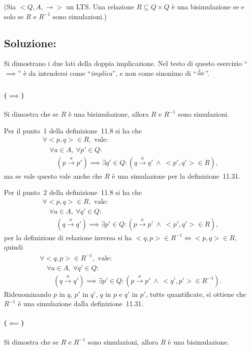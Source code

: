 \documentclass[a4paper,twosides]{report}
\begin{document}
{\tiny
(Sia $<Q, A, \rightarrow >$ un LTS. Una relazione $R \subseteq Q \times Q$ è una bisimulazione se e solo se $R$ e $R^{-1}$
sono simulazioni.)
}
\subsection*{Soluzione:}
Si dimostrano i due lati della doppia implicazione. Nel testo di
questo esercizio ``$\implies$'' \`e da intendersi come ``\emph{implica}'', e
non come sinonimo di ``$\xRightarrow{\varepsilon}$''.
\paragraph{($\implies$)} Si dimostra che se $R$ \`e una
bisimulazione, allora $R$ e $R^{-1}$ sono simulazioni.

Per il punto~1 della
definizione~11.8 si ha che 
\begin{align*}
&\forall <p,q>\in R,\text{ vale:}\\
&\quad\forall a\in A,\ \forall p'\in Q:\\
&\quad\quad(p\xrightarrow{a} p')\implies\exists q'\in Q:(q\xrightarrow{a} q'\
\land\ <p',q'>\in R),
\end{align*}
ma se vale questo vale anche che $R$ \`e
una simulazione per la definizione~11.31.

Per il punto~2 della definizione~11.8 si ha che
\begin{align*}
&\forall <p,q>\in R,\text{ vale:}\\
&\quad\forall a\in A,\ \forall q'\in Q:\\
&\quad\quad(q\xrightarrow{a} q')\implies\exists p'\in Q:(p\xrightarrow{a} p'\
\land\ <p',q'>\in R),
\end{align*}
per la definizione di relazione inversa si ha
$<q,p>\in R^{-1}\iff<p,q>\in R$, quindi
\begin{align*}
&\forall <q,p>\in R^{-1},\text{ vale:}\\
&\quad\forall a\in A,\ \forall q'\in Q:\\
&\quad\quad(q\xrightarrow{a} q')\implies\exists p'\in Q:(p\xrightarrow{a} p'\
\land\ <q',p'>\in R^{-1}).
\end{align*}
Ridenominando $p$ in $q$, $p'$ in $q'$, $q$ in $p$ e $q'$ in $p'$,
tutte quantificate, si ottiene che $R^{-1}$ \`e una simulazione 
dalla definizione~11.31.

\paragraph{($\impliedby$)} Si dimostra che se $R$ e $R^{-1}$ sono
simulazioni, allora $R$ \`e una bisimulazione.
\end{document}
